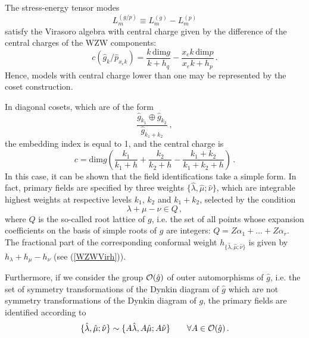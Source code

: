 \documentclass[a4paper,12pt]{report}
\begin{document}
The stress-energy tensor modes
\begin{equation}
L_{m}^{(g/p)}\equiv L_{m}^{(g)}-L_{m}^{(p)}
\end{equation}
satisfy the Virasoro algebra with central charge given by the difference of the central charges of the WZW
components:
\begin{equation}
c\left(\hat{g}_{k}/\hat{p}_{x_{e}k}\right)=\frac{k\,\textrm{dim}g}{k+h_{q}}-\frac{x_{e}k\,\textrm{dim}p}{x_{e}k+h_{p}}\,.
\end{equation}
Hence, models with central charge lower than one may be represented by the coset construction.


In diagonal cosets, which are of the form
\begin{equation}
\frac{\hat{g}_{k_{1}}\oplus\hat{g}_{k_{2}}}{\hat{g}_{k_{1}+k_{2}}}\:,
\end{equation}
the embedding index is equal to 1, and the central charge is
\begin{equation}
c=\textrm{dim}g \left(\frac{k_{1}}{k_{1}+h}+\frac{k_{2}}{k_{2}+h}-\frac{k_{1}+k_{2}}{k_{1}+k_{2}+h}\right)\,.
\end{equation}
In this case, it can be shown that the field identifications take a simple form. In fact, primary fields are
specified by three weights $\{\hat{\lambda},\hat{\mu};\hat{\nu}\}$, which are integrable highest weights at
respective levels $k_{1}$, $k_{2}$ and $k_{1}+k_{2}$, selected by the condition
\begin{equation}\label{cosetfields}
\lambda+\mu-\nu\in Q \,,
\end{equation}
where $Q$ is the so-called root lattice of $g$, i.e. the set of all points whose expansion coefficients on the
basis of simple roots of $g$ are integers: $Q=Z\alpha_{1}+...+Z\alpha_{r}$. The fractional part of the
corresponding conformal weight $h_{\{\hat{\lambda},\hat{\mu};\hat{\nu}\}}$ is given by
$h_{\lambda}+h_{\mu}-h_{\nu}$ (see (\ref{WZWVirh})).

Furthermore, if we consider the group ${\cal O}(\hat{g})$ of outer automorphisms of $\hat{g}$, i.e. the set of
symmetry transformations of the Dynkin diagram of $\hat{g}$ which are not symmetry transformations of the Dynkin
diagram of $g$, the primary fields are identified according to
\begin{equation}
\{\hat{\lambda},\hat{\mu};\hat{\nu}\}\sim \{A\hat{\lambda},A\hat{\mu};A\hat{\nu}\}\qquad\forall A\in{\cal
O}(\hat{g})\,.
\end{equation}

\vspace{0.5cm}
\end{document}

